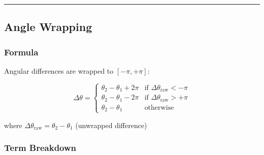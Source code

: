 \documentclass[
  11pt,
]{article}
\begin{document}
\begin{center}\rule{0.5\linewidth}{0.5pt}\end{center}

\hypertarget{angle-wrapping}{%
\subsection{Angle Wrapping}\label{angle-wrapping}}

\hypertarget{formula-2}{%
\subsubsection{Formula}\label{formula-2}}

Angular differences are wrapped to \([-\pi, +\pi]\):

\[\Delta\theta = \begin{cases}
\theta_2 - \theta_1 + 2\pi & \text{if } \Delta\theta_{\text{raw}} < -\pi \\
\theta_2 - \theta_1 - 2\pi & \text{if } \Delta\theta_{\text{raw}} > +\pi \\
\theta_2 - \theta_1 & \text{otherwise}
\end{cases}\]

where \(\Delta\theta_{\text{raw}} = \theta_2 - \theta_1\) (unwrapped
difference)

\hypertarget{term-breakdown-2}{%
\subsubsection{Term Breakdown}\label{term-breakdown-2}}
\end{document}
